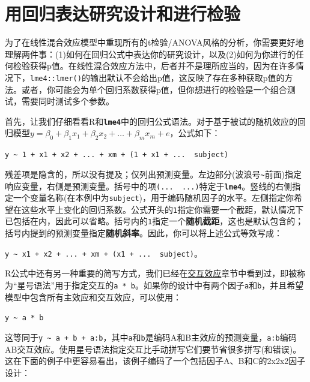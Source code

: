 \documentclass[
]{book}
\begin{document}
\hypertarget{ux7528ux56deux5f52ux8868ux8fbeux7814ux7a76ux8bbeux8ba1ux548cux8fdbux884cux68c0ux9a8c}{%
\section{用回归表达研究设计和进行检验}\label{ux7528ux56deux5f52ux8868ux8fbeux7814ux7a76ux8bbeux8ba1ux548cux8fdbux884cux68c0ux9a8c}}

为了在线性混合效应模型中重现所有的t检验/ANOVA风格的分析，你需要更好地理解两件事：(1)如何在回归公式中表达你的研究设计，以及(2)如何为你进行的任何检验获得p值。在线性混合效应方法中，后者并不是理所应当的，因为在许多情况下，\texttt{lme4::lmer()}的输出默认不会给出p值，这反映了存在多种获取p值的方法\citep{Luke_2017}。或者，你可能会为单个回归系数获得p值，但你想进行的检验是一个组合测试，需要同时测试多个参数。

首先，让我们仔细看看R和\textbf{\texttt{lme4}}中的回归公式语法。对于基于被试的随机效应的回归模型\(y = \beta_0 + \beta_1 x_1 + \beta_2 x_2 + \ldots + \beta_m x_m + e\)，公式如下：

\texttt{y\ \textasciitilde{}\ 1\ +\ x1\ +\ x2\ +\ ...\ +\ xm\ +\ (1\ +\ x1\ +\ ...\ \textbar{}\ subject)}

残差项是隐含的，所以没有提及；仅列出预测变量。左边部分(波浪号\texttt{\textasciitilde{}}前面)指定响应变量，右侧是预测变量。括号中的项\texttt{(...\ \textbar{}\ ...)}特定于\textbf{\texttt{lme4}}。竖线\texttt{\textbar{}}的右侧指定一个变量名称(在本例中为\texttt{subject})，用于编码随机因子的水平。左侧指定你希望在这些水平上变化的回归系数。公式开头的\texttt{1}指定你需要一个截距，默认情况下已包括在内，因此可以省略。括号内的\texttt{1}指定一个\textbf{随机截距}，这也是默认包含的；括号内提到的预测变量指定\textbf{随机斜率}。因此，你可以将上述公式等效写成：

\texttt{y\ \textasciitilde{}\ x1\ +\ x2\ +\ ...\ +\ xm\ +\ (x1\ +\ ...\ \textbar{}\ subject)}。

R公式中还有另一种重要的简写方式，我们已经在\protect\hyperlink{ux4ea4ux4e92ux6548ux5e94}{交互效应}章节中看到过，即被称为``星号语法''用于指定交互的\texttt{a\ *\ b}。如果你的设计中有两个因子\texttt{a}和\texttt{b}，并且希望模型中包含所有主效应和交互效应，可以使用：

\texttt{y\ \textasciitilde{}\ a\ *\ b}

这等同于\texttt{y\ \textasciitilde{}\ a\ +\ b\ +\ a:b}，其中\texttt{a}和\texttt{b}是编码A和B主效应的预测变量，\texttt{a:b}编码AB交互效应。使用星号语法指定交互比手动拼写它们要节省很多拼写(和错误)。这在下面的例子中更容易看出，该例子编码了一个包括因子A、B和C的2x2x2因子设计：
\end{document}
